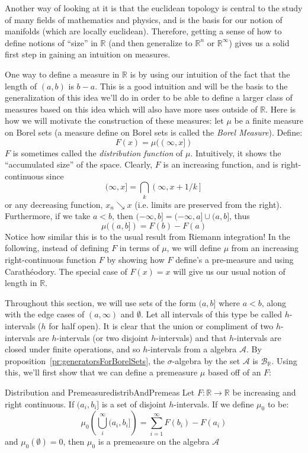 \documentclass[oneside]{book}
\newcommand{\R}{\mathbb{R}}
\newcommand{\CA}{\mathcal{A}}
\newcommand{\BB}{\mathcal{B}}
\newcommand{\rw}{\rightarrow}
\begin{document}
Another way of looking at it is that the euclidean topology is central to the study of many fields of mathematics and
physics, and is the basis for our notion of manifolds (which are locally euclidean). Therefore, getting a sense of how
to define notions of ``size'' in $\R$ (and then generalize to $\R^n$ or $\R^\infty$) gives us a solid first step in gaining an intuition on measures.

One way to define a measure in $\R$ is by using our intuition of the fact that the length of $(a,b)$ is $b-a$. This is
a good intuition and will be the basis to the generalization of this idea we'll do in order to be able to define
a larger class of measures based on this idea which will also have more uses outside of $\R$. Here is how we will
motivate the construction of these measures: let $\mu$ be a finite measure on Borel sets (a measure define on Borel sets is called the \emph{Borel Measure}).
Define:
\[
	F(x) = \mu((\infty, x])
\]
$F$ is sometimes called the \emph{distribution function} of $\mu$. Intuitively, it shows the ``accumulated size'' of the
space. Clearly, $F$ is an increasing function, and is right-continuous since 
\[
	(\infty, x] = \bigcap_k \left(\infty, x + 1/k\right]
\]
or any decreasing function, $x_n \searrow x$ (i.e. limits are preserved from the right). Furthermore, if we take $a < b$, then $(-\infty, b] = (-\infty, a] \cup
(a, b]$, thus 
\[
	\mu((a,b]) = F(b) - F(a)
\]
Notice how similar this is to the usual result from Riemann integration! In the following, instead of defining $F$ in
terms of $\mu$, we will define $\mu$ from an increasing right-continuous function $F$ by showing how $F$ define's
a pre-measure and using Carath\'eodory. The special case of $F(x) = x$ will give us our usual notion of length in $\R$. 

Throughout this section, we will use sets of the form $(a,b]$ where $a < b$, along with the edge cases of $(a, \infty)$
and $\emptyset$. Let all intervals of this type be called $h$-intervals ($h$ for half open). It is clear that the union or
compliment of two $h$-intervals are $h$-intervals (or two disjoint $h$-intervals) and that $h$-intervals are closed under finite
operations, and so $h$-intervals from a algebra $\CA$. By proposition~\ref{pr:generatorsForBorelSets}, the
$\sigma$-algebra by the set $\CA$ is $\BB_\R$. Using this, we'll first show that we can define a premeasure $\mu$ based
off of an $F$:

\begin{prop}{Distribution and Premeasure}{distribAndPremeas}
	Let $F: \R \rw \R$ be increasing and right continuous. If $(a_i, b_i]$ is a set of disjoint $h$-intervals. If we
	define $\mu_0$ to be: 
	\[
		\mu_0\left(\bigcup_i^\infty (a_i, b_i]\right) = \sum_{i=1}^\infty F(b_i) - F(a_i)
		\]
		and $\mu_0(\emptyset) = 0$, then $\mu_0$ is a premeasure on the algebra $\CA$
\end{prop}
\end{document}

